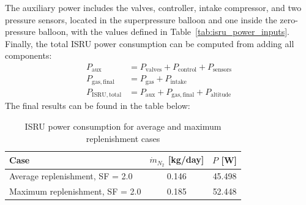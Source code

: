 The auxiliary power includes the valves, controller, intake compressor, and two pressure sensors, located in the superpressure balloon and one inside the zero-pressure balloon, with the values defined in Table~\ref{tab:isru_power_inputs}. Finally, the total ISRU power consumption can be computed from adding all components:
\begin{align}
    P_{\mathrm{aux}} &=
    P_{\mathrm{valves}}
    +
    P_{\mathrm{control}}
    +
    P_{\mathrm{sensors}}
    \\
    P_{\mathrm{gas,final}} &=
    P_{\mathrm{gas}}
    +
    P_{\mathrm{intake}}
    \\
    P_{\mathrm{ISRU,total}} &=
    P_{\mathrm{aux}}
    +
    P_{\mathrm{gas,final}}
    +
    P_{\mathrm{altitude}}
\end{align}
The final results can be found in the table below:


\begin{table}[H]
\centering
\caption{ISRU power consumption for average and maximum replenishment cases}
\label{tab:isru_power_results}
\renewcommand{\arraystretch}{1.15}
\small
\begin{tabular}{p{4.2cm} c c}
\toprule
\textbf{Case} & 
\textbf{$\dot{m}_{N_2}$ [kg/day]} & 
\textbf{$P$ [W]} \\
\midrule
Average replenishment, SF = 2.0 
& 0.146 & 45.498 \\

Maximum replenishment, SF = 2.0 
& 0.185 & 52.448 \\
\bottomrule
\end{tabular}
\end{table}


